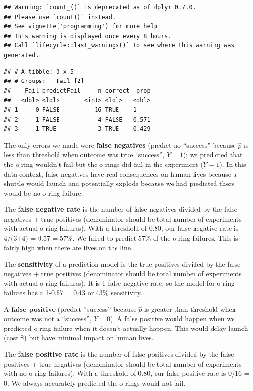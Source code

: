 \documentclass[
]{book}
\begin{document}
\begin{verbatim}
## Warning: `count_()` is deprecated as of dplyr 0.7.0.
## Please use `count()` instead.
## See vignette('programming') for more help
## This warning is displayed once every 8 hours.
## Call `lifecycle::last_warnings()` to see where this warning was generated.
\end{verbatim}

\begin{verbatim}
## # A tibble: 3 x 5
## # Groups:   Fail [2]
##    Fail predictFail     n correct  prop
##   <dbl> <lgl>       <int> <lgl>   <dbl>
## 1     0 FALSE          16 TRUE    1    
## 2     1 FALSE           4 FALSE   0.571
## 3     1 TRUE            3 TRUE    0.429
\end{verbatim}

The only errors we made were \textbf{false negatives} (predict no ``success'' because \(\hat{p}\) is less than threshold when outcome was true ``success'', \(Y=1\)); we predicted that the o-ring wouldn't fail but the o-rings did fail in the experiment (\(Y=1\)). In this data context, false negatives have real consequences on human lives because a shuttle would launch and potentially explode because we had predicted there would be no o-ring failure.

The \textbf{false negative rate} is the number of false negatives divided by the false negatives + true positives (denominator should be total number of experiments with actual o-ring failures). With a threshold of 0.80, our false negative rate is 4/(3+4) = 0.57 = 57\%. We failed to predict 57\% of the o-ring failures. This is fairly high when there are lives on the line.

The \textbf{sensitivity} of a prediction model is the true positives divided by the false negatives + true positives (denominator should be total number of experiments with actual o-ring failures). It is 1-false negative rate, so the model for o-ring failures has a 1-0.57 = 0.43 or 43\% sensitivity.

A \textbf{false positive} (predict ``success'' because \(\hat{p}\) is greater than threshold when outcome was not a ``success'', \(Y=0\)). A false positive would happen when we predicted o-ring failure when it doesn't actually happen. This would delay launch (cost \$) but have minimal impact on human lives.

The \textbf{false positive rate} is the number of false positives divided by the false positives + true negatives (denominator should be total number of experiments with no o-ring failures). With a threshold of 0.80, our false positive rate is 0/16 = 0. We always accurately predicted the o-rings would not fail.
\end{document}
